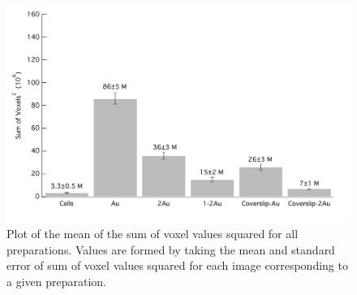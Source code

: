 \begin{figure}[htbp]
\centering
\includegraphics[keepaspectratio,width=\textwidth,height=0.75\textheight]{3aprSOSgraph.pdf}
\caption{Plot of the mean of the sum of voxel values squared for all preparations. Values are formed by taking the mean and standard error of sum of voxel values squared for each image corresponding to a given preparation.}
\label{aprsos}
\end{figure}



